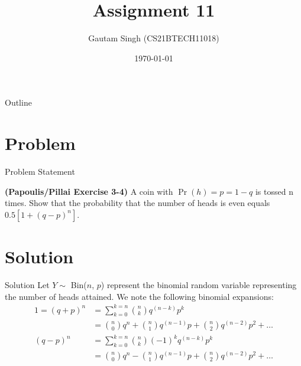 \documentclass{beamer}
\title{Assignment 11}
\author{Gautam Singh (CS21BTECH11018)}
\date{\today}
\providecommand{\pr}[1]{\ensuremath{\Pr\left(#1\right)}}
\begin{document}
\begin{frame}
    \titlepage 
\end{frame}

\logo{}


\begin{frame}{Outline}
    \tableofcontents
\end{frame}


\section{Problem}
\begin{frame}{Problem Statement}

\textbf{(Papoulis/Pillai Exercise 3-4)} A coin with $\pr{h} = p = 1 - q$ is tossed n times. Show that the probability that the number
of heads is even equals $0.5[1 + (q - p)^n]$. 

\end{frame}


\section{Solution}

\begin{frame}{Solution}
    Let $Y \sim$ Bin($n$, $p$) represent the binomial random variable representing the number of heads attained. We note the following binomial expansions:
    \begin{align}
        1 = (q + p)^n &= \sum_{k = 0}^{k = n}\binom{n}{k}q^{(n - k)}p^k \\
        &= \binom{n}{0}q^n + \binom{n}{1}q^{(n - 1)}p + \binom{n}{2}q^{(n - 2)}p^2 + \ldots \label{eq:t1}\\
        (q - p)^n &= \sum_{k = 0}^{k = n}\binom{n}{k}(-1)^kq^{(n - k)}p^k \\
        &= \binom{n}{0}q^n - \binom{n}{1}q^{(n - 1)}p + \binom{n}{2}q^{(n - 2)}p^2 + \ldots \label{eq:t2}
    \end{align}
\end{frame}
\end{document}
